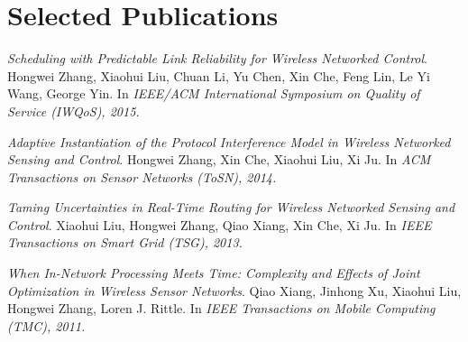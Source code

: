 
\section{Selected Publications}
\begin{thebibliography}{4}
\emph{Scheduling with Predictable Link Reliability for Wireless Networked Control}. Hongwei Zhang, Xiaohui Liu, Chuan Li, Yu Chen,
Xin Che, Feng Lin, Le Yi Wang, George Yin. In \emph{IEEE/ACM International Symposium on Quality of Service (IWQoS), 2015.}

\emph{Adaptive Instantiation of the Protocol Interference Model in Wireless Networked Sensing and Control}. Hongwei Zhang, Xin Che, Xiaohui Liu, Xi Ju. In \emph{ACM Transactions on Sensor Networks (ToSN), 2014.}

\emph{Taming Uncertainties in Real-Time Routing for Wireless Networked Sensing and Control}. Xiaohui Liu, Hongwei Zhang, Qiao Xiang, Xin Che, Xi Ju. In \emph{IEEE Transactions on Smart Grid (TSG), 2013.}

\emph{When In-Network Processing Meets Time: Complexity and Effects of Joint Optimization in Wireless Sensor Networks}. Qiao Xiang, Jinhong Xu, Xiaohui Liu, Hongwei Zhang, Loren J. Rittle. In \emph{IEEE Transactions on Mobile Computing (TMC), 2011.}



\end{thebibliography}

